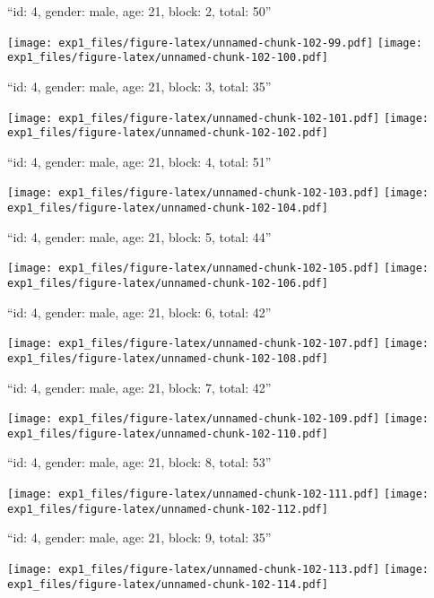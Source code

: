 \documentclass[11pt,,]{article}
\begin{document}
\newpage
[1] 

``id: 4, gender: male, age: 21, block: 2, total: 50''

\texttt{[image: exp1\_files/figure-latex/unnamed-chunk-102-99.pdf]}
\texttt{[image: exp1\_files/figure-latex/unnamed-chunk-102-100.pdf]}

\newpage
[1] 

``id: 4, gender: male, age: 21, block: 3, total: 35''

\texttt{[image: exp1\_files/figure-latex/unnamed-chunk-102-101.pdf]}
\texttt{[image: exp1\_files/figure-latex/unnamed-chunk-102-102.pdf]}

\newpage
[1] 

``id: 4, gender: male, age: 21, block: 4, total: 51''

\texttt{[image: exp1\_files/figure-latex/unnamed-chunk-102-103.pdf]}
\texttt{[image: exp1\_files/figure-latex/unnamed-chunk-102-104.pdf]}

\newpage
[1] 

``id: 4, gender: male, age: 21, block: 5, total: 44''

\texttt{[image: exp1\_files/figure-latex/unnamed-chunk-102-105.pdf]}
\texttt{[image: exp1\_files/figure-latex/unnamed-chunk-102-106.pdf]}

\newpage
[1] 

``id: 4, gender: male, age: 21, block: 6, total: 42''

\texttt{[image: exp1\_files/figure-latex/unnamed-chunk-102-107.pdf]}
\texttt{[image: exp1\_files/figure-latex/unnamed-chunk-102-108.pdf]}

\newpage
[1] 

``id: 4, gender: male, age: 21, block: 7, total: 42''

\texttt{[image: exp1\_files/figure-latex/unnamed-chunk-102-109.pdf]}
\texttt{[image: exp1\_files/figure-latex/unnamed-chunk-102-110.pdf]}

\newpage
[1] 

``id: 4, gender: male, age: 21, block: 8, total: 53''

\texttt{[image: exp1\_files/figure-latex/unnamed-chunk-102-111.pdf]}
\texttt{[image: exp1\_files/figure-latex/unnamed-chunk-102-112.pdf]}

\newpage
[1] 

``id: 4, gender: male, age: 21, block: 9, total: 35''

\texttt{[image: exp1\_files/figure-latex/unnamed-chunk-102-113.pdf]}
\texttt{[image: exp1\_files/figure-latex/unnamed-chunk-102-114.pdf]}
\end{document}
